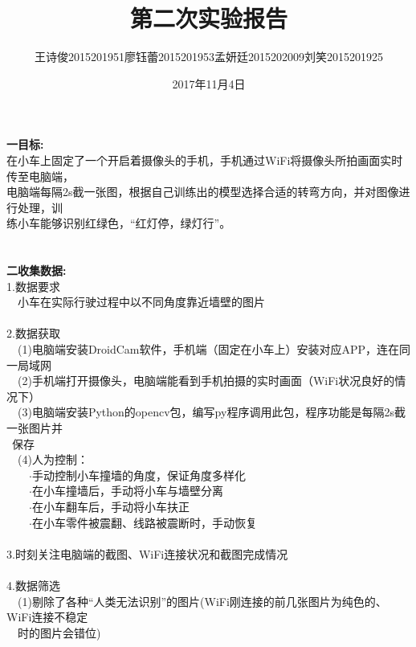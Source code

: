 \documentclass[19pt,a4paper]{article}
\title{第二次实验报告}
\author{王诗俊2015201951\quad 廖钰蕾2015201953\quad  孟妍廷2015202009\quad  刘笑2015201925}
\date{2017年11月4日}
\begin{document}
\maketitle

\textbf{一\quad 目标:}\\
\indent 在小车上固定了一个开启着摄像头的手机，手机通过WiFi将摄像头所拍画面实时传至电脑端，\\
\indent 电脑端每隔2s截一张图，根据自己训练出的模型选择合适的转弯方向，并对图像进行处理，训\\
\indent 练小车能够识别红绿色，“红灯停，绿灯行”。\\
\\
\\
\indent\textbf{二\quad 收集数据:}\\ 
\indent 1.数据要求\\
\indent\ \ 小车在实际行驶过程中以不同角度靠近墙壁的图片\\
 \\
\indent 2.数据获取\\
\indent\ \ (1)电脑端安装DroidCam软件，手机端（固定在小车上）安装对应APP，连在同一局域网\\
\indent\ \ (2)手机端打开摄像头，电脑端能看到手机拍摄的实时画面（WiFi状况良好的情况下）\\
\indent\ \ (3)电脑端安装Python的opencv包，编写py程序调用此包，程序功能是每隔2s截一张图片并\\
\indent \ 保存\\
\indent\ \ (4)人为控制：\\
\indent\ \ \ \ $\cdot$手动控制小车撞墙的角度，保证角度多样化\\
\indent\ \ \ \ $\cdot$在小车撞墙后，手动将小车与墙壁分离\\
\indent\ \ \ \ $\cdot$在小车翻车后，手动将小车扶正\\
\indent\ \ \ \ $\cdot$在小车零件被震翻、线路被震断时，手动恢复\\
\\
\indent 3.时刻关注电脑端的截图、WiFi连接状况和截图完成情况\\
\\
\indent 4.数据筛选\\
\indent\ \ (1)剔除了各种“人类无法识别”的图片(WiFi刚连接的前几张图片为纯色的、WiFi连接不稳定\\
\indent\ \ 时的图片会错位)\\
\end{document}

